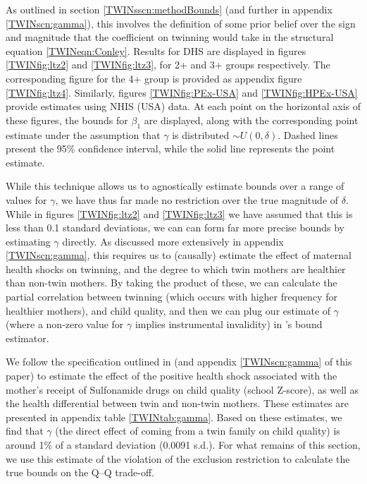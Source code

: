 \documentclass[subeqn]{article}
\begin{document}
\begin{spacing}{1.4}
As outlined in section \ref{TWINsscn:methodBounds} (and further in appendix
\ref{TWINscn:gamma}), this involves the definition of some prior belief over 
the sign and magnitude that the coefficient on twinning would take in the 
structural equation \ref{TWINeqn:Conley}. Results for DHS are displayed in 
figures \ref{TWINfig:ltz2} and \ref{TWINfig:ltz3}, for 2+ and 3+ groups 
respectively. The corresponding figure for the 4+ group is provided as appendix
figure \ref{TWINfig:ltz4}. Similarly, figures \ref{TWINfig:PEx-USA} and
\ref{TWINfig:HPEx-USA} provide estimates using NHIS (USA) data. At each point 
on the horizontal axis of these figures, the bounds for $\beta_1$ are displayed, 
along with the corresponding point estimate under the assumption that $\gamma$ 
is distributed $\sim U(0,\delta)$. Dashed lines present the 95\% confidence 
interval, while the solid line represents the point estimate.

While this technique allows us to agnostically estimate bounds over a range 
of values for $\gamma$, we have thus far made no restriction over the true 
magnitude of $\delta$.  While in figures \ref{TWINfig:ltz2} and 
\ref{TWINfig:ltz3} we have assumed that this is less than 0.1 standard 
deviations, we can can form far more precise bounds by estimating $\gamma$ 
directly.  As discussed more extensively in appendix \ref{TWINscn:gamma}, this 
requires us to (causally) estimate the effect of maternal health shocks on 
twinning, and the degree to which twin mothers are healthier than non-twin
mothers.  By taking the product of these, we can calculate the partial 
correlation between twinning (which occurs with higher frequency for healthier 
mothers), and child quality, and then we can plug our estimate of $\gamma$ 
(where a non-zero value for $\gamma$ implies instrumental invalidity) in 
\citeauthor{Conleyetal2012}'s bound estimator.

We follow the specification outlined in \citet{BhalotraVenkataramani2014}
(and appendix \ref{TWINscn:gamma} of this paper) to estimate the effect of 
the positive health shock associated with the mother's receipt of Sulfonamide 
drugs on child quality (school Z-score), as well as the health differential
between twin and non-twin mothers.  These estimates are presented in appendix 
table \ref{TWINtab:gamma}.  Based on these estimates, we find that $\gamma$
(the direct effect of coming from a twin family on child quality) is around
1\% of a standard deviation (0.0091 s.d.).  For what remains of this section, 
we use this estimate of the violation of the exclusion restriction to 
calculate the true bounds on the Q--Q trade-off.


\end{spacing}
\end{document}
